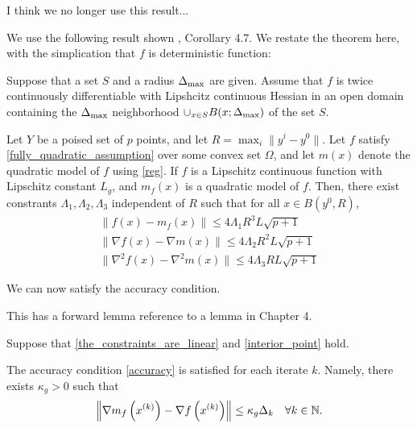 \begin{boxedcomment}
I think we no longer use this result...
\end{boxedcomment}

We use the following result shown \cite{BillupsLarson2013}, Corollary 4.7.
We restate the theorem here, with the simplication that $f$ is deterministic function:

\begin{assumption}
\label{fully_quadratic_assumption}
Suppose that a set $S$ and a radius ${\Delta_{\textrm{max}}}$ are given.
Assume that $f$ is twice continuously differentiable with Lipshcitz continuous Hessian in an open domain containing the ${\Delta_{\textrm{max}}}$ neighborhood
$\cup_{x \in S} B(x; {\Delta_{\textrm{max}}})$ of the set $S$.
\end{assumption}

\begin{lemma}
\label{larson_change_radius} 
Let $Y$ be a poised set of $p$ points, and let $R = \max_{i}\|y^i - y^0\|$.
Let $f$ satisfy \cref{fully_quadratic_assumption} over some convex set $\Omega$, and let $m(x)$ denote the quadratic model of $f$ using \cref{reg}.
If $f$ is a Lipschitz continuous function with Lipschitz constant $L_g$, and $m_f(x)$ is a quadratic model of $f$.
Then, there exist constrants $\Lambda_1, \Lambda_2, \Lambda_3$ independent of $R$ such that for all $x \in B(y^0, R)$,
\begin{align*}
\|f(x) - m_f(x)\| \le 4\Lambda_1 R^3L \sqrt{p+1} \\
\|\nabla f(x) - \nabla m(x)\| \le 4\Lambda_2R^2  L \sqrt{p+1} \\
\|\nabla^2 f(x) - \nabla^2 m(x)\| \le 4\Lambda_3  RL \sqrt{p+1}
\end{align*}
\end{lemma}

We can now satisfy the accuracy condition.


\begin{boxedcomment}
This has a forward lemma reference to a lemma in Chapter 4.
\end{boxedcomment}

\begin{theorem}
\label{linear_accuracy_is_satisfied}
Suppose that \cref{the_constraints_are_linear} and \cref{interior_point} hold.

The accuracy condition \cref{accuracy} is satisfied for each iterate $k$.
Namely, there exists $\kappa_{g} > 0$ such that 
\begin{align*}
\left\|\nabla m_f\left(x^{(k)}\right) - \nabla f\left(x^{(k)}\right)\right\| \le \kappa_g \Delta_k \quad \forall k \in \mathbb N.
\end{align*}
\end{theorem}

